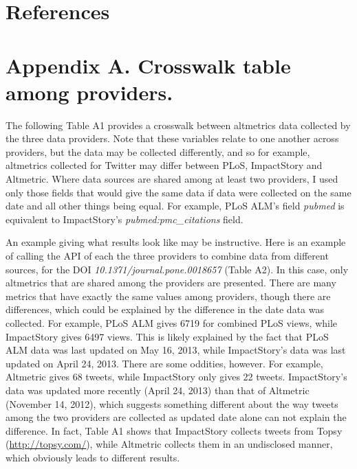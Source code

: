 \documentclass[letterpaper,superscriptaddress,showkeys,longbibliography]{revtex4-1}\usepackage{graphicx, color}
\begin{document}
\section*{References}


\section*{Appendix A. Crosswalk table among providers.}

The following Table A1 provides a crosswalk between altmetrics data collected by the three data providers. Note that these variables relate to one another across providers, but the data may be collected differently, and so for example, altmetrics collected for Twitter may differ between PLoS, ImpactStory and Altmetric. Where data sources are shared among at least two providers, I used only those fields that would give the same data if data were collected on the same date and all other things being equal. For example, PLoS ALM's field \emph{pubmed} is equivalent to ImpactStory's \emph{pubmed:pmc\_citations} field.

An example giving what results look like may be instructive. Here is an example of calling the API of each the three providers to combine data from different sources, for the DOI \emph{10.1371/journal.pone.0018657} \cite{piwowar2011} (Table A2). In this case, only altmetrics that are shared among the providers are presented. There are many metrics that have exactly the same values among providers, though there are differences, which could be explained by the difference in the date data was collected. For example, PLoS ALM gives 6719 for combined PLoS views, while ImpactStory gives 6497 views. This is likely explained by the fact that PLoS ALM data was last updated on May 16, 2013, while ImpactStory's data was last updated on April 24, 2013. There are some oddities, however. For example, Altmetric gives 68 tweets, while ImpactStory only gives 22 tweets. ImpactStory's data was updated more recently (April 24, 2013) than that of Altmetric (November 14, 2012), which suggests something different about the way tweets among the two providers are collected as updated date alone can not explain the difference. In fact, Table A1 shows that ImpactStory collects tweets from Topsy (\url{http://topsy.com/}), while Altmetric collects them in an undisclosed manner, which obviously leads to different results.
\end{document}
